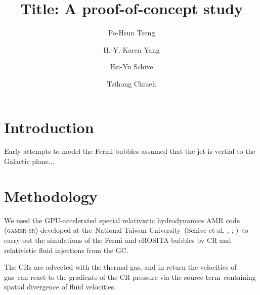 \documentclass[twocolumn]{aastex631}
\begin{document}
\title{Title: A proof-of-concept study}


\author[0000-0002-1868-0660]{Po-Hsun Tseng}

\author[0000-0003-3269-4660]{H.-Y. Karen Yang}

\author[0000-0002-1249-279X]{Hsi-Yu Schive}

\author[0000-0003-2654-8763]{Tzihong Chiueh}





\begin{abstract}
\end{abstract}

\section{Introduction}
Early attempts to model the Fermi bubbles assumed that the jet is vertial to the Galactic plane...

\section{Methodology}

  We used the GPU-accelerated special relativistic hydrodynamics AMR code (\textsc{gamer-sr}) developed at the\
  National Taiwan University\
  (Schive et al. \citeyear{gamer-1}, \citeyear{gamer-2}; \citeauthor{tseng2021} \citeyear{tseng2021})\
  to carry out the simulations of the Fermi and eROSITA bubbles by CR and relativistic fluid injections from the GC.

  The CRs are advected with the thermal gas, and in return the velocities of gas\
  can react to the gradients of the CR pressure via the source term\
  containing spatial divergence of fluid velocities.\
\end{document}
